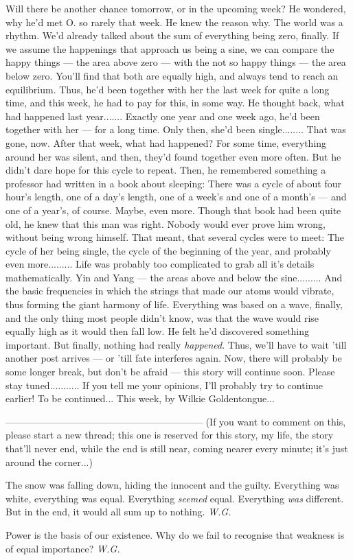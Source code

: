 Will there be another chance tomorrow, or in the upcoming week?
He wondered, why he'd met O. so rarely that week. 
He knew the reason why. 
The world was a rhythm. 
We'd already talked about the sum of everything being zero, finally. If we assume the happenings that approach us being a sine, we can compare the happy things --- the area above zero --- with the not so happy things --- the area below zero. 
You'll find that both are equally high, and always tend to reach an equilibrium. 
Thus, he'd been together with her the last week for quite a long time, and this week, he had to pay for this, in some way. He thought back, what had happened last year.......
Exactly one year and one week ago, he'd been together with her --- for a long time. Only then, she'd been single........
That was gone, now. 
After that week, what had happened?
For some time, everything around her was silent, and then, they'd found together even more often. 
But he didn't dare hope for this cycle to repeat. 
Then, he remembered something a professor had written in a book about sleeping: There was a cycle of about four hour's length, one of a day's length, one of a week's and one of a month's --- and one of a year's, of course. 
Maybe, even more. 
Though that book had been quite old, he knew that this man was right. 
Nobody would ever prove him wrong, without being wrong himself. 
That meant, that several cycles were to meet: The cycle of her being single, the cycle of the beginning of the year, and probably even more.........
Life was probably too complicated to grab all it's details mathematically. 
Yin and Yang --- the areas above and below the sine.........
And the basic frequencies in which the strings that made our atoms would vibrate, thus forming the giant harmony of life. 
Everything was based on a wave, finally, and the only thing most people didn't know, was that the wave would rise equally high as it would then fall low. 
He felt he'd discovered something important. 
But finally, nothing had really \emph{happened}. 
Thus, we'll have to wait 'till another post arrives --- or 'till fate interferes again. 
Now, there will probably be some longer break, but don't be afraid --- this story will continue soon. 
Please stay tuned...........
If you tell me your opinions, I'll probably try to continue earlier!
To be continued...
This week, by Wilkie Goldentongue...

--------------------------------------------------------------
(If you want to comment on this, please start a new thread; this one is reserved for this story, my life, the story that'll never end, while the end is still near, coming nearer every minute; it's just around the corner...)

The snow was falling down, 
hiding the innocent 
and the guilty. 
Everything was white, 
everything was equal. 
Everything \emph{seemed} equal. 
Everything \emph{was} different. 
But in the end, it would all sum up 
to nothing. 
\emph{W.G.}

Power 
is the basis of our existence. 
Why do we fail to recognise 
that weakness is of equal importance? 
\emph{W.G.}
